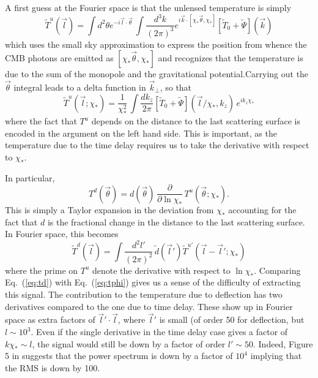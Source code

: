 \documentclass[prl,amsmath,amssymb,floatfix,superscriptaddress,nofootinbib,twocolumn]{revtex4-1}
\def\be{\begin{equation}}
\def\ee{\end{equation}}
\newcommand{\ec}[1]{Eq.~(\ref{eq:#1})}
\newcommand{\eql}[1]{\label{eq:#1}}
\begin{document}
A first guess at the Fourier space is
that the unlensed temperature is simply
\begin{equation}
\tilde T^u(\vec l) = \int d^2\theta e^{-i\vec l\cdot \vec\theta}\, \int \frac{d^3k}{(2\pi)^3} e^{i\vec k\cdot [\chi_*\vec\theta,\chi_*]}  [\tilde T_0+\tilde\Psi](\vec k)
\end{equation}
which uses the small sky approximation to express the position from whence the CMB photons are emitted as $[\chi_*\vec\theta,\chi_*]$ and recognizes that the temperature is due to the sum of the monopole and the gravitational potential.Carrying out the $\vec\theta$ integral leads to a delta function in $\vec k_\perp$, so that 
\begin{equation}
\tilde T^u(\vec l;\chi_*) = 
\frac{1}{\chi_*^2}\, \int \frac{dk_z}{2\pi}  [\tilde T_0+\tilde\Psi](\vec l/\chi_*,k_z)\,e^{ik_z\chi_*}\eql{tu}
\end{equation}
where the fact that $T^u$ depends on the distance to the last scattering surface is encoded in the argument on the left hand side.
This is important, as the temperature due to the time delay requires us to take the derivative with respect to $\chi_*$.

In particular,
\be
T^d(\vec\theta) = d(\vec\theta)\,\frac{\partial}{\partial\ln\chi_*}\, T^u(\vec\theta;\chi_*).
\ee
This is simply a Taylor expansion in the deviation from $\chi_*$ accounting for the fact that $d$ is the fractional change in the distance to the last scattering surface. In Fourier space, this becomes
\begin{equation}
\tilde T^d(\vec l) = \int \frac{d^2l'}{(2\pi)^2}\, \tilde d(\vec l') \tilde T^{u'}(\vec l-\vec l';\chi_*) %
\eql{td}\end{equation}
where the prime on $T^u$ denote the  derivative with respect to $\ln\chi_*$. Comparing \ec{td} with \ec{tphi}  gives us a sense of the difficulty of extracting this signal. The contribution to the temperature due to deflection has two derivatives compared to the one due to time delay. These show up in Fourier space as extra factors of $\vec l'\cdot\vec l$, where $\vec l'$ is small (of order 50 for deflection, but $l\sim 10^3$. Even if the single derivative in the time delay case gives a factor of $k\chi_*\sim l$, the signal would still be down by a factor of order $l'\sim50$. Indeed, Figure 5 in \cite{Hu:2001yq} suggests that the power spectrum is down by a factor of $10^4$ implying that the RMS is down by 100. %
\end{document}
